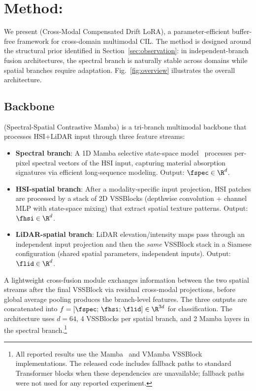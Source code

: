 \section{Method: \methodname{}}
\label{sec:method}

We present \methodname{} (Cross-Modal Compensated Drift LoRA), a parameter-efficient buffer-free framework for cross-domain multimodal CIL.
The method is designed around the structural prior identified in Section~\ref{sec:observation}: in independent-branch fusion architectures, the spectral branch is naturally stable across domains while spatial branches require adaptation.
Fig.~\ref{fig:overview} illustrates the overall architecture.



\subsection{\backbonename{} Backbone}
\label{sec:backbone}

\backbonename{} (Spectral-Spatial Contrastive Mamba) is a tri-branch multimodal backbone that processes HSI+LiDAR input through three feature streams:

\begin{itemize}
    \item \textbf{Spectral branch}: A 1D Mamba selective state-space model~\cite{gu2024mamba} processes per-pixel spectral vectors of the HSI input, capturing material absorption signatures via efficient long-sequence modeling. Output: $\fspec \in \R^{d}$.
    \item \textbf{HSI-spatial branch}: After a modality-specific input projection, HSI patches are processed by a stack of 2D VSSBlocks (depthwise convolution + channel MLP with state-space mixing) that extract spatial texture patterns. Output: $\fhsi \in \R^{d}$.
    \item \textbf{LiDAR-spatial branch}: LiDAR elevation/intensity maps pass through an independent input projection and then the \emph{same} VSSBlock stack in a Siamese configuration (shared spatial parameters, independent inputs). Output: $\flid \in \R^{d}$.
\end{itemize}

A lightweight cross-fusion module exchanges information between the two spatial streams after the final VSSBlock via residual cross-modal projections, before global average pooling produces the branch-level features.
The three outputs are concatenated into $f = [\fspec;\, \fhsi;\, \flid] \in \R^{3d}$ for classification.
The architecture uses $d{=}64$, 4 VSSBlocks per spatial branch, and 2 Mamba layers in the spectral branch.\footnote{All reported results use the Mamba~\cite{gu2024mamba} and VMamba VSSBlock implementations. The released code includes fallback paths to standard Transformer blocks when these dependencies are unavailable; fallback paths were not used for any reported experiment.}


